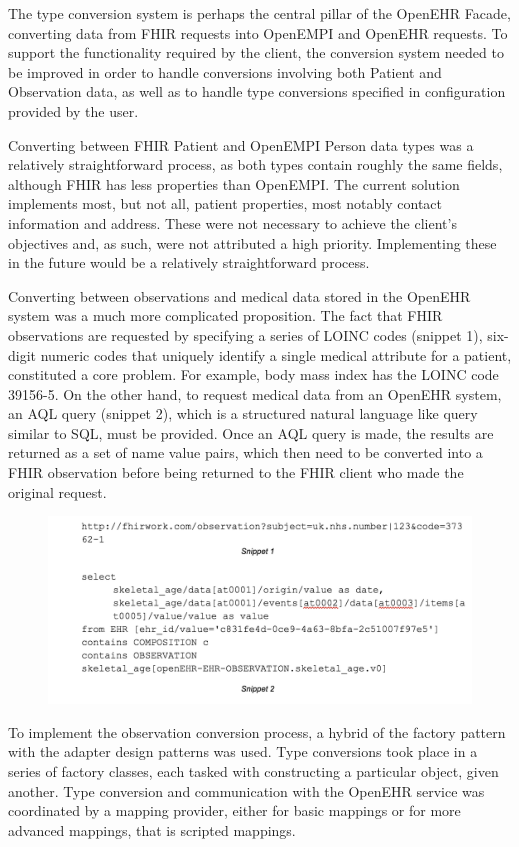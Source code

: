 \documentclass[sigconf]{acmart}
\begin{document}
The type conversion system is perhaps the central pillar of the OpenEHR Facade, converting data from FHIR requests into OpenEMPI and OpenEHR requests. To support the functionality required by the client, the conversion system needed to be improved in order to handle conversions involving both Patient and Observation data, as well as to handle type conversions specified in configuration provided by the user.

Converting between FHIR Patient and OpenEMPI Person data types was a relatively straightforward process, as both types contain roughly the same fields, although FHIR has less properties than OpenEMPI. The current solution implements most, but not all, patient properties, most notably contact information and address. These were not necessary to achieve the client’s objectives and, as such, were not attributed a high priority. Implementing these in the future would be a relatively straightforward process.

Converting between observations and medical data stored in the OpenEHR system was a much more complicated proposition. The fact that FHIR observations are requested by specifying a series of LOINC codes (snippet 1), six-digit numeric codes that uniquely identify a single medical attribute for a patient, constituted a core problem. For example, body mass index has the LOINC code 39156-5. On the other hand, to request medical data from an OpenEHR system, an AQL query (snippet 2), which is a structured natural language like query similar to SQL, must be provided. Once an AQL query is made, the results are returned as a set of name value pairs, which then need to be converted into a FHIR observation before being returned to the FHIR client who made the original request. 

\begin{figure}[!!h] 
	\centering 
	\includegraphics[width=0.8\columnwidth]{figure3.png}

\end{figure}

To implement the observation conversion process, a hybrid of the factory pattern with the adapter design patterns was used. Type conversions took place in a series of factory classes, each tasked with constructing a particular object, given another. Type conversion and communication with the OpenEHR service was coordinated by a mapping provider, either for basic mappings or for more advanced mappings, that is scripted mappings.
\end{document}
